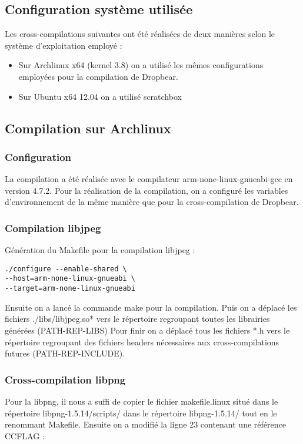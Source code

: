 \subsection{Configuration système utilisée}
Les cross-compilations suivantes ont été réalisées de deux manières selon le système d'exploitation employé : 

\begin{itemize}
\item Sur Archlinux x64 (kernel 3.8) on a utilisé les mêmes configurations employées pour la compilation de Dropbear.
\item Sur Ubuntu x64 12.04 on a utilisé scratchbox %
\end{itemize}

\newpage

\subsection{Compilation sur Archlinux}

\subsubsection{Configuration}
La compilation a été réalisée avec le compilateur arm-none-linux-gnueabi-gcc en version 4.7.2.
Pour la réalisation de la compilation, on a configuré les variables d'environnement de la même manière que pour la cross-compilation de  Dropbear.


\subsubsection{Compilation libjpeg}
Génération du Makefile pour la compilation libjpeg :

\begin{lstlisting}
./configure --enable-shared \
--host=arm-none-linux-gnueabi \
--target=arm-none-linux-gnueabi
\end{lstlisting}

Ensuite on a lancé la commande make pour la compilation.
Puis on a déplacé les fichiers ./libs/libjpeg.so* vers le répertoire regroupant toutes les librairies générées (PATH-REP-LIBS)
Pour finir on a déplacé tous les fichiers *.h vers le répertoire regroupant des fichiers headers nécessaires aux cross-compilations futures (PATH-REP-INCLUDE).

\subsubsection{Cross-compilation libpng}
Pour la libpng, il nous a suffi de copier le fichier makefile.linux situé dans le répertoire libpng-1.5.14/scripts/ dans le répertoire libpng-1.5.14/ tout en le renommant Makefile. Ensuite on a modifié la ligne 23 contenant une référence CCFLAG : 

